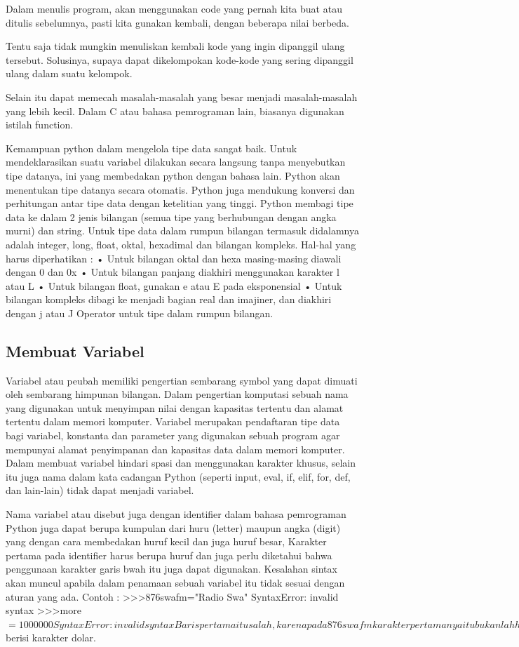 Dalam menulis program, akan menggunakan code yang pernah kita  buat atau ditulis sebelumnya, pasti
kita gunakan kembali, dengan beberapa nilai berbeda.
 
Tentu saja tidak mungkin menuliskan kembali kode yang ingin dipanggil ulang tersebut.
Solusinya, supaya dapat dikelompokan kode-kode yang sering dipanggil ulang dalam suatu kelompok.

Selain itu dapat memecah masalah-masalah yang besar  menjadi masalah-masalah yang lebih kecil.
Dalam C atau bahasa pemrograman lain, biasanya digunakan istilah function.

Kemampuan python dalam mengelola tipe data sangat baik. Untuk mendeklarasikan suatu variabel dilakukan secara langsung tanpa menyebutkan tipe datanya, ini yang membedakan python dengan bahasa lain. Python akan menentukan tipe datanya secara otomatis. Python juga mendukung konversi dan perhitungan antar tipe data dengan ketelitian yang tinggi. Python membagi tipe data ke dalam 2 jenis bilangan (semua tipe yang berhubungan dengan angka murni) dan string. Untuk tipe data dalam rumpun bilangan termasuk didalamnya adalah integer, long, float, oktal, hexadimal dan bilangan kompleks. Hal-hal yang harus diperhatikan :
•	Untuk bilangan oktal dan hexa masing-masing diawali dengan 0 dan 0x
•	Untuk bilangan panjang diakhiri menggunakan karakter l atau L
•	Untuk bilangan float, gunakan e atau E pada eksponensial
•	Untuk bilangan kompleks dibagi ke menjadi bagian real dan imajiner, dan diakhiri dengan j atau J Operator untuk tipe dalam rumpun bilangan.\cite{utamipemrograman}

\subsection{Membuat Variabel}
Variabel atau peubah memiliki pengertian sembarang symbol yang dapat dimuati oleh sembarang himpunan bilangan. Dalam pengertian komputasi sebuah nama yang digunakan untuk menyimpan nilai dengan kapasitas tertentu dan alamat tertentu dalam memori komputer. Variabel merupakan pendaftaran tipe data bagi variabel, konstanta dan parameter yang digunakan sebuah program agar mempunyai alamat penyimpanan dan kapasitas data dalam memori komputer. Dalam membuat variabel hindari spasi dan menggunakan karakter khusus, selain itu juga nama dalam kata cadangan Python (seperti input, eval, if, elif, for, def, dan lain-lain) tidak dapat menjadi variabel.\cite{irfani2016bahan}

Nama variabel atau disebut juga dengan identifier dalam bahasa pemrograman Python juga dapat berupa kumpulan dari huru (letter) maupun angka (digit) yang dengan cara membedakan huruf kecil dan juga huruf besar, Karakter pertama pada identifier harus berupa huruf dan juga perlu diketahui bahwa penggunaan karakter garis bwah itu juga dapat digunakan.
Kesalahan sintax akan muncul apabila dalam penamaan sebuah variabel itu tidak sesuai dengan aturan yang ada.
Contoh :
>>>876swafm="Radio Swa"
SyntaxError: invalid syntax
>>>more$=1000000
SyntaxError: invalid syntax
Baris pertama itu salah, karena pada 876swafm karakter pertamanya itu bukanlah huruf. Pada baris ketiga juga salah karena pada more$ berisi karakter dolar.

